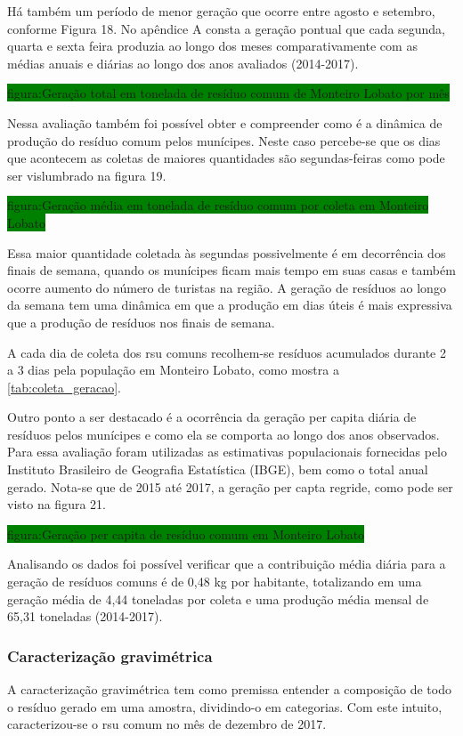 	Há também um período de menor geração que ocorre entre agosto e setembro, conforme Figura 18. No apêndice A consta a geração pontual que cada segunda, quarta e sexta feira produzia ao longo dos meses comparativamente com as médias anuais e diárias ao longo dos anos avaliados (2014-2017).
	
	\colorbox{green}{figura:Geração total em tonelada de resíduo comum de Monteiro Lobato por mês}
	
	Nessa avaliação também foi possível obter e compreender como é a dinâmica de produção do resíduo comum pelos munícipes. Neste caso percebe-se que os dias que acontecem as coletas de maiores quantidades são segundas-feiras como pode ser vislumbrado na figura 19.
	
	\colorbox{green}{figura:Geração média em tonelada de resíduo comum por coleta em Monteiro Lobato}
	
	Essa maior quantidade coletada às segundas possivelmente é em decorrência dos finais de semana, quando os munícipes ficam mais tempo em suas casas e também ocorre aumento do número de turistas na região. A geração de resíduos ao longo da semana tem uma dinâmica em que a produção em dias úteis é mais expressiva que a produção de resíduos nos finais de semana.
	
	A cada dia de coleta dos \gls{rsu} comuns recolhem-se resíduos acumulados durante 2 a 3 dias pela população em Monteiro Lobato, como mostra a \autoref{tab:coleta_geracao}.
	
	

	Outro ponto a ser destacado é a ocorrência da geração per capita diária de resíduos pelos munícipes e como ela se comporta ao longo dos anos observados. Para essa avaliação foram utilizadas as estimativas populacionais fornecidas pelo Instituto Brasileiro de Geografia Estatística (IBGE), bem como o total anual gerado. Nota-se que de 2015 até 2017, a geração per capta regride, como pode ser visto na figura 21.
	
	\colorbox{green}{figura:Geração per capita de resíduo comum em Monteiro Lobato}
	
	Analisando os dados foi possível verificar que a contribuição média diária para a geração de resíduos comuns é de 0,48 kg por habitante, totalizando em uma geração média de 4,44 toneladas por coleta e uma produção média mensal de 65,31 toneladas (2014-2017).
	
	\subsubsection{Caracterização gravimétrica} 	
	A caracterização gravimétrica tem como premissa entender a composição de todo o resíduo gerado em uma amostra, dividindo-o em categorias. Com este intuito, caracterizou-se o \gls{rsu} comum no mês de dezembro de 2017.
	
